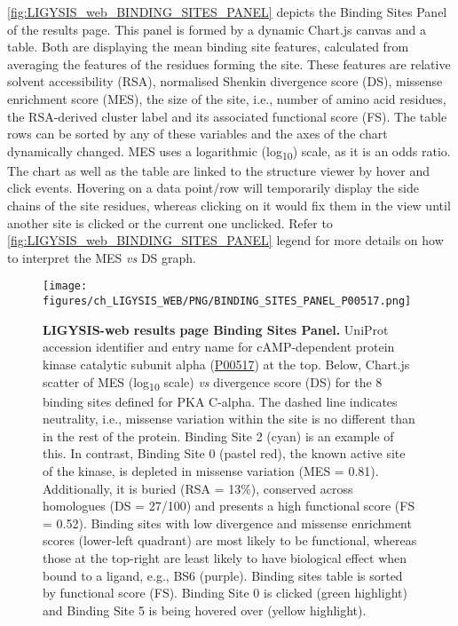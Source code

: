 \autoref{fig:LIGYSIS_web_BINDING_SITES_PANEL} depicts the Binding Sites Panel of the results page. This panel is formed by a dynamic Chart.js canvas and a table. Both are displaying the mean binding site features, calculated from averaging the features of the residues forming the site. These features are relative solvent accessibility (RSA), normalised Shenkin divergence score (DS), missense enrichment score (MES), the size of the site, i.e., number of amino acid residues, the RSA-derived cluster label and its associated functional score (FS). The table rows can be sorted by any of these variables and the axes of the chart dynamically changed. MES uses a logarithmic (log\textsubscript{10}) scale, as it is an odds ratio. The chart as well as the table are linked to the structure viewer by hover and click events. Hovering on a data point/row will temporarily display the side chains of the site residues, whereas clicking on it would fix them in the view until another site is clicked or the current one unclicked. Refer to \autoref{fig:LIGYSIS_web_BINDING_SITES_PANEL} legend for more details on how to interpret the MES \textit{vs} DS graph.

\begin{figure}[htb!]
    \centering
    \texttt{[image: figures/ch\_LIGYSIS\_WEB/PNG/BINDING\_SITES\_PANEL\_P00517.png]}
    \caption[LIGYSIS-web results page Binding Sites Panel]{\textbf{LIGYSIS-web results page Binding Sites Panel.} UniProt accession identifier and entry name for cAMP-dependent protein kinase catalytic subunit alpha (\href{https://www.uniprot.org/uniprotkb/P00517/entry}{P00517}) at the top. Below, Chart.js scatter of MES (log\textsubscript{10} scale) \textit{vs} divergence score (DS) for the 8 binding sites defined for PKA C-alpha. The dashed line indicates neutrality, i.e., missense variation within the site is no different than in the rest of the protein. Binding Site 2 (cyan) is an example of this. In contrast, Binding Site 0 (pastel red), the known active site of the kinase, is depleted in missense variation (MES = 0.81). Additionally, it is buried (RSA = 13\%), conserved across homologues (DS = 27/100) and presents a high functional score (FS = 0.52). Binding sites with low divergence and missense enrichment scores (lower-left quadrant) are most likely to be functional, whereas those at the top-right are least likely to have biological effect when bound to a ligand, e.g., BS6 (purple). Binding sites table is sorted by functional score (FS). Binding Site 0 is clicked (green highlight) and Binding Site 5 is being hovered over (yellow highlight).}
    \label{fig:LIGYSIS_web_BINDING_SITES_PANEL}
\end{figure}

